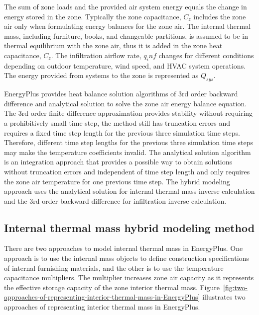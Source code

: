 The sum of zone loads and the provided air system energy equals the change in energy stored in the zone. Typically the zone capacitance, $C_z$ includes the zone air only when formulating energy balances for the zone air. The internal thermal mass, including furniture, books, and changeable partitions, is assumed to be in thermal equilibrium with the zone air, thus it is added in the zone heat capacitance, $C_z$.  The infiltration airflow rate, $q_inf$ changes for different conditions depending on outdoor temperature, wind speed, and HVAC system operations. The energy provided from systems to the zone is represented as $Q_{sys}$.

EnergyPlus provides heat balance solution algorithms of 3rd order backward difference and analytical solution to solve the zone air energy balance equation. The 3rd order finite difference approximation provides stability without requiring a prohibitively small time step, the method still has truncation errors and requires a fixed time step length for the previous three simulation time steps. Therefore, different time step lengths for the previous three simulation time steps may make the temperature coefficients invalid. The analytical solution algorithm is an integration approach that provides a possible way to obtain solutions without truncation errors and independent of time step length and only requires the zone air temperature for one previous time step. The hybrid modeling approach uses the analytical solution for internal thermal mass inverse calculation and the 3rd order backward difference for infiltration inverse calculation. 


\subsection{Internal thermal mass hybrid modeling method}\label{internal-thermal-mass-hybrid-modeling method}

There are two approaches to model internal thermal mass in EnergyPlus. One approach is to use the internal mass objects to define construction specifications of internal furnishing materials, and the other is to use the temperature capacitance multipliers. The multiplier increases zone air capacity as it represents the effective storage capacity of the zone interior thermal mass. Figure~\ref {fig:two-approaches-of-representing-interior-thermal-mass-in-EnergyPlus} illustrates two approaches of representing interior thermal mass in EnergyPlus.

